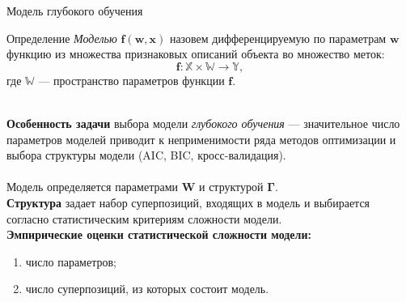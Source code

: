 \documentclass[usenames,dvipsnames,11pt,pdf,utf8,russian,aspectratio=43]{beamer}
\begin{document}
\begin{frame}{Модель глубокого обучения}
\small
\begin{block}{Определение}
\textit{Моделью} $\mathbf{f}(\mathbf{w}, \mathbf{x})$ назовем дифференцируемую по параметрам $\mathbf{w}$ функцию из множества признаковых описаний объекта во множество меток:
\[
    \mathbf{f}: \mathbb{X} \times \mathbb{W} \to \mathbb{Y},
\] 
где $\mathbb{W}$ --- пространство параметров функции $\mathbf{f}$.
\end{block}
~\\
\textbf{Особенность задачи}  выбора модели \textit{глубокого обучения} --- значительное число параметров моделей приводит к неприменимости ряда методов оптимизации и выбора структуры модели  (AIC, BIC, кросс-валидация). \\~\\
Модель определяется параметрами $\mathbf{W}$ и структурой $\boldsymbol{\Gamma}$.\\
\textbf{Структура} задает набор суперпозиций, входящих в модель и выбирается согласно статистическим критериям сложности модели.\\

\textbf{Эмпирические оценки статистической сложности модели:}
\begin{enumerate}
\item число параметров;
\item число суперпозиций, из которых состоит модель.
\end{enumerate}
\end{frame}
\end{document}
